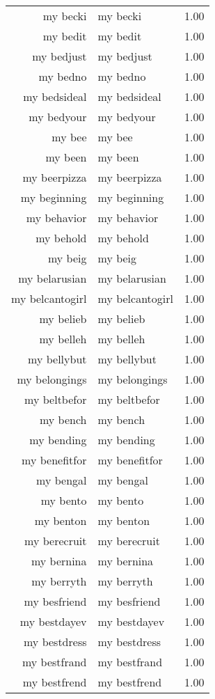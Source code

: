 \begin{table}[ht]
\begin{tabular}{rlr}
  my becki & my becki & 1.00 \\ 
  my bedit & my bedit & 1.00 \\ 
  my bedjust & my bedjust & 1.00 \\ 
  my bedno & my bedno & 1.00 \\ 
  my bedsideal & my bedsideal & 1.00 \\ 
  my bedyour & my bedyour & 1.00 \\ 
  my bee & my bee & 1.00 \\ 
  my been & my been & 1.00 \\ 
  my beerpizza & my beerpizza & 1.00 \\ 
  my beginning & my beginning & 1.00 \\ 
  my behavior & my behavior & 1.00 \\ 
  my behold & my behold & 1.00 \\ 
  my beig & my beig & 1.00 \\ 
  my belarusian & my belarusian & 1.00 \\ 
  my belcantogirl & my belcantogirl & 1.00 \\ 
  my belieb & my belieb & 1.00 \\ 
  my belleh & my belleh & 1.00 \\ 
  my bellybut & my bellybut & 1.00 \\ 
  my belongings & my belongings & 1.00 \\ 
  my beltbefor & my beltbefor & 1.00 \\ 
  my bench & my bench & 1.00 \\ 
  my bending & my bending & 1.00 \\ 
  my benefitfor & my benefitfor & 1.00 \\ 
  my bengal & my bengal & 1.00 \\ 
  my bento & my bento & 1.00 \\ 
  my benton & my benton & 1.00 \\ 
  my berecruit & my berecruit & 1.00 \\ 
  my bernina & my bernina & 1.00 \\ 
  my berryth & my berryth & 1.00 \\ 
  my besfriend & my besfriend & 1.00 \\ 
  my bestdayev & my bestdayev & 1.00 \\ 
  my bestdress & my bestdress & 1.00 \\ 
  my bestfrand & my bestfrand & 1.00 \\ 
  my bestfrend & my bestfrend & 1.00 \\ 

\end{tabular}
\end{table}
